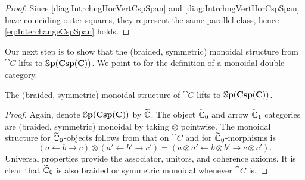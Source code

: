 \begin{proof}
	Since \eqref{diag:IntrchngHorVertCspSpan} 
	and \eqref{diag:IntrchngVertHorCspSpan} 
	have coinciding outer squares, 
	they represent the same parallel class,
	hence \eqref{eq:InterchangeCspSpan} holds.
\end{proof}

Our next step is to show that 
the (braided, symmetric) monoidal structure 
from $\cat{C}$ lifts to $\mathbb{S}\mathbf{p(Csp(C))}$.
We point to 
	\cite[Def.~2.9]{Shulman_ConstructSMBicats} 
for the definition of a monoidal double category.

\begin{lem}
	\label{lem:SpanCospanSM}
	The (braided, symmetric) monoidal structure 
	of $\cat{C}$ lifts to $\mathbb{S}\mathbf{p(Csp(C))}$.
\end{lem}

\begin{proof}
	Again, denote 
	$\mathbb{S}\mathbf{p(Csp(C))}$ by $\widetilde{\mathbb{C}}$. 
	The object $\widetilde{\mathbb{C}}_0$ and 
	arrow $\widetilde{\mathbb{C}}_1$ categories are 
	(braided, symmetric) monoidal
	by taking $\otimes$ pointwise.  
	The monoidal structure for 
	$\widetilde{\mathbb{C}}_0$-objects follows 
	from that on $\cat{C}$ and 
	for $\widetilde{\mathbb{C}}_0$-morphisms is
	\[
	(a \gets b \to c) \otimes (a' \gets b' \to c')
	=
	(a\otimes a' \gets b\otimes b' \to c\otimes c').
	\]
	Universal properties provide 
	the associator, unitors, 
	and coherence axioms. 
	It is clear that $\widetilde{\mathbb{C}}_0$ is 
	also braided or symmetric monoidal 
	whenever $\cat{C}$ is.
	

\end{proof}
